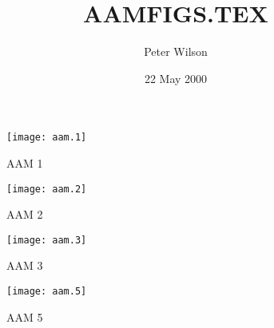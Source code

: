 \documentclass[11pt]{article}
\title{AAMFIGS.TEX}
\author{Peter Wilson} \date{22 May 2000}
\begin{document}
\maketitle
\listoffigures
\clearpage

\begin{sidewaysfigure}
\centering
\texttt{[image: aam.1]}
\caption{AAM 1}
\end{sidewaysfigure}

\begin{sidewaysfigure}
\centering
\texttt{[image: aam.2]}
\caption{AAM 2}
\end{sidewaysfigure}

\begin{sidewaysfigure}
\centering
\texttt{[image: aam.3]}
\caption{AAM 3}
\end{sidewaysfigure}

\begin{figure}
\centering
\texttt{[image: aam.5]}
\caption{AAM 5}
\end{figure}
\end{document}
